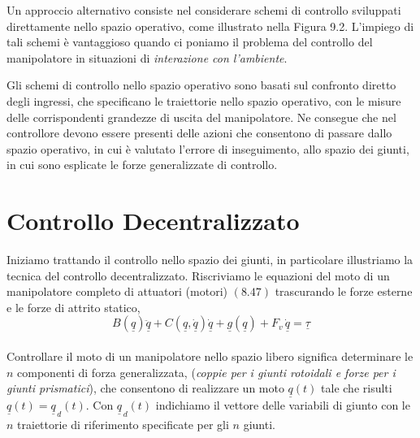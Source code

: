 Un approccio alternativo consiste nel considerare schemi di controllo sviluppati direttamente nello spazio operativo, come illustrato nella Figura 9.2. L'impiego di tali schemi è vantaggioso quando ci poniamo il problema del controllo del manipolatore in situazioni di \emph{interazione con l'ambiente}. 

Gli schemi di controllo nello spazio operativo sono basati sul confronto diretto degli ingressi, che specificano le traiettorie nello spazio operativo, con le misure delle corrispondenti grandezze di uscita del manipolatore. Ne consegue che nel controllore devono essere presenti delle azioni che consentono di passare dallo spazio operativo, in cui è valutato l'errore di inseguimento, allo spazio dei giunti, in cui sono esplicate le forze generalizzate di controllo.

\section{Controllo Decentralizzato}
Iniziamo trattando il controllo nello spazio dei giunti, in particolare illustriamo la tecnica del controllo decentralizzato. Riscriviamo le equazioni del moto di un manipolatore completo di attuatori (motori) $(8.47)$ trascurando le forze esterne e le forze di attrito statico,
\begin{equation}
	B(\underline{q})\ddot{\underline{q}} + C(\underline{q}, \underline{\dot{q}}) \underline{\dot{q}} + \underline{g}(\underline{q}) + F_v \,\underline{\dot{q}} = \underline{\tau}   
\end{equation}

\paragraph{}
Controllare il moto di un manipolatore nello spazio libero significa determinare le $n$ componenti di forza generalizzata, (\emph{coppie per i giunti rotoidali e forze per i giunti prismatici}), che consentono di realizzare un moto $\underline{q}(t)$ tale che risulti $\underline{q}(t) = \underline{q}_{\,d}(t)$. Con $\underline{q}_{\,d}(t)$ indichiamo il vettore delle  variabili di giunto con le $n$ traiettorie di riferimento specificate per gli $n$ giunti.

